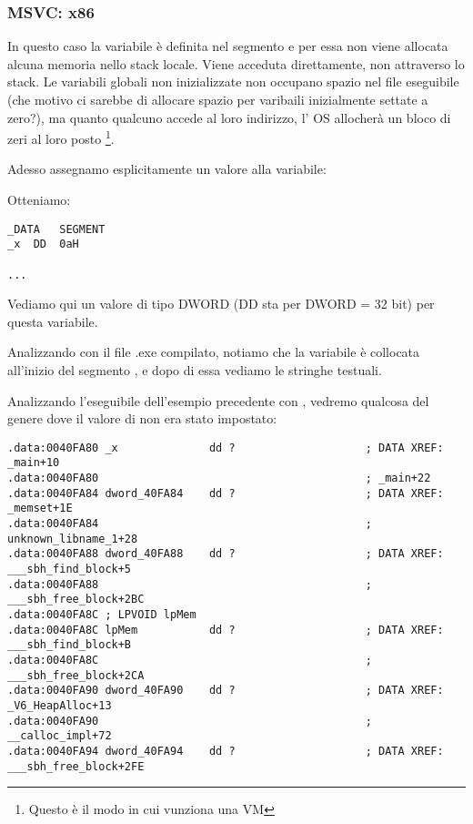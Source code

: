 \subsubsection{MSVC: x86}



In questo caso la variabile  è definita nel segmento  e per essa non viene allocata alcuna memoria nello stack locale. Viene acceduta direttamente, non attraverso lo stack.
Le variabili globali non inizializzate non occupano spazio nel file eseguibile 
(che motivo ci sarebbe di allocare spazio per varibaili inizialmente settate a zero?), 
ma quanto qualcuno accede al loro indirizzo, l' \ac{OS} allocherà un bloco di zeri al loro posto \footnote{Questo è il modo in cui vunziona una \ac{VM} }.

Adesso assegnamo esplicitamente un valore alla variabile:



Otteniamo:

\begin{lstlisting}
_DATA	SEGMENT
_x	DD	0aH

...
\end{lstlisting}

Vediamo qui un valore  di tipo DWORD (DD sta per DWORD = 32 bit) per questa variabile.

Analizzando con \IDA il file .exe compilato, notiamo che la variabile  è collocata all'inizio del segmento , e dopo di essa vediamo le stringhe testuali.

Analizzando l'eseguibile dell'esempio precedente con \IDA, vedremo qualcosa del genere dove il valore di  non era stato impostato:

\begin{lstlisting}
.data:0040FA80 _x              dd ?                    ; DATA XREF: _main+10
.data:0040FA80                                         ; _main+22
.data:0040FA84 dword_40FA84    dd ?                    ; DATA XREF: _memset+1E
.data:0040FA84                                         ; unknown_libname_1+28
.data:0040FA88 dword_40FA88    dd ?                    ; DATA XREF: ___sbh_find_block+5
.data:0040FA88                                         ; ___sbh_free_block+2BC
.data:0040FA8C ; LPVOID lpMem
.data:0040FA8C lpMem           dd ?                    ; DATA XREF: ___sbh_find_block+B
.data:0040FA8C                                         ; ___sbh_free_block+2CA
.data:0040FA90 dword_40FA90    dd ?                    ; DATA XREF: _V6_HeapAlloc+13
.data:0040FA90                                         ; __calloc_impl+72
.data:0040FA94 dword_40FA94    dd ?                    ; DATA XREF: ___sbh_free_block+2FE
\end{lstlisting}


